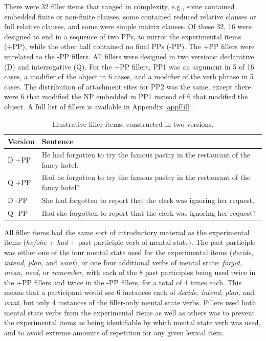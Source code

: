 \documentclass[12pt,oneside]{book}
\begin{document}
There were 32 filler items that ranged in complexity, e.g., some contained embedded finite or non-finite clauses, some contained reduced relative clauses or full relative clauses, and some were simple matrix clauses. Of these 32, 16 were designed to end in a sequence of two PPs, to mirror the experimental items (+PP), while the other half contained no final PPs (-PP). The +PP fillers were unrelated to the -PP fillers. All fillers were designed in two versions: declarative (D) and interrogative (Q). For the +PP fillers, PP1 was an argument in 5 of 16 cases, a modifier of the object in 6 cases, and a modifier of the verb phrase in 5 cases. The distribution of attachment sites for PP2 was the same, except there were 6 that modified the NP embedded in PP1 instead of 6 that modified the object. A full list of fillers is available in Appendix \ref{appFill}.

\begin{table}[!h]

\caption{\label{tab:fsentences}Illustrative filler items, constructed in two versions.}
\centering
\begin{tabular}{ll}
\toprule
Version & Sentence\\
\midrule
D +PP & He had forgotten to try the famous pastry in the restaurant of the fancy hotel.\\
Q +PP & Had he forgotten to try the famous pastry in the restaurant of the fancy hotel?\\
\hline
\addlinespace
D -PP & She had forgotten to report that the clerk was ignoring her request.\\
Q -PP & Had she forgotten to report that the clerk was ignoring her request?\\
\bottomrule
\end{tabular}
\end{table}

All filler items had the same sort of introductory material as the experimental items (\emph{he/she} + \emph{had} + past participle verb of mental state). The past participle was either one of the four mental state used for the experimental items (\emph{decide}, \emph{intend}, \emph{plan}, and \emph{want}), or one four additional verbs of mental state: \emph{forgot}, \emph{mean}, \emph{need}, or \emph{remember}, with each of the 8 past participles being used twice in the +PP fillers and twice in the -PP fillers, for a total of 4 times each. This means that a participant would see 6 instances each of \emph{decide}, \emph{intend}, \emph{plan}, and \emph{want}, but only 4 instances of the filler-only mental state verbs. Fillers used both mental state verbs from the experimental items as well as others was to prevent the experimental items as being identifiable by which mental state verb was used, and to avoid extreme amounts of repetition for any given lexical item.
\end{document}
